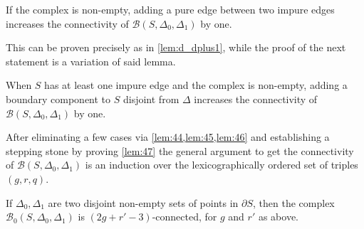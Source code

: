 \begin{lemma}[label=lem:46]
	If the complex is non-empty, adding a pure edge between two impure edges increases the connectivity of $\mathcal{B}(S,\Delta_0,\Delta_1)$ by one.
\end{lemma}

This can be proven precisely as in \autoref{lem:d_dplus1}, while the proof of the next statement is a variation of said lemma.

\begin{lemma}[label=lem:47]
	When $S$ has at least one impure edge and the complex is non-empty, adding a boundary component to $S$ disjoint from $\Delta$ increases the connectivity of $\mathcal{B}(S,\Delta_0,\Delta_1)$ by one.
\end{lemma}

After eliminating a few cases via \cref{lem:44,lem:45,lem:46} and establishing a stepping stone by proving \cref{lem:47} the general argument to get the connectivity of $\mathcal{B}(S,\Delta_0,\Delta_1)$ is an induction over the lexicographically ordered set of triples $(g,r,q)$.

\begin{theorem}[label=thm:48]
	If $\Delta_0, \Delta_1$ are two disjoint non-empty sets of points in $\partial S$, then the complex $\mathcal{B}_0(S,\Delta_0,\Delta_1)$ is $(2g+r'-3)$-connected, for $g$ and $r'$ as above.
\end{theorem}


